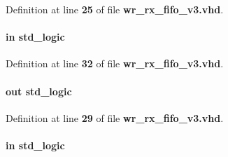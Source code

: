Definition at line {\bf 25} of file {\bf wr\+\_\+rx\+\_\+fifo\+\_\+v3.\+vhd}.

\paragraph[{fifo\+\_\+wfull}]{ {\bfseries \textcolor{keywordflow}{in}\textcolor{vhdlchar}{ }} {\bfseries \textcolor{comment}{std\+\_\+logic}\textcolor{vhdlchar}{ }} \hspace{0.3cm}{\ttfamily [Port]}}\label{classwr__rx__fifo__v3_a63de1b8160d1ffec718f19920aa9a2a1}


Definition at line {\bf 32} of file {\bf wr\+\_\+rx\+\_\+fifo\+\_\+v3.\+vhd}.

\paragraph[{fifo\+\_\+wr}]{ {\bfseries \textcolor{keywordflow}{out}\textcolor{vhdlchar}{ }} {\bfseries \textcolor{comment}{std\+\_\+logic}\textcolor{vhdlchar}{ }} \hspace{0.3cm}{\ttfamily [Port]}}\label{classwr__rx__fifo__v3_abad7153eeefd341545091d5d2b698cf5}


Definition at line {\bf 29} of file {\bf wr\+\_\+rx\+\_\+fifo\+\_\+v3.\+vhd}.

\paragraph[{fr\+\_\+start}]{ {\bfseries \textcolor{keywordflow}{in}\textcolor{vhdlchar}{ }} {\bfseries \textcolor{comment}{std\+\_\+logic}\textcolor{vhdlchar}{ }} \hspace{0.3cm}{\ttfamily [Port]}}\label{classwr__rx__fifo__v3_a2e71bd12426c63495ee40ba7316f5c24}


